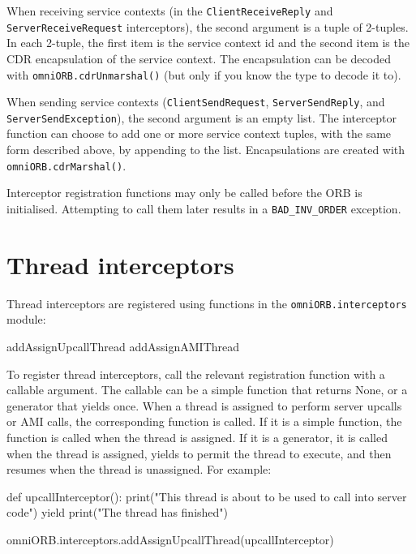 \documentclass[11pt,oneside,a4paper]{book}
\newcommand{\code}[1]{\texttt{#1}}
\newcommand{\op}[1]{\texttt{#1()}}
\newcommand{\dsc}{\discretionary{}{}{}}
\begin{document}
When receiving service contexts (in the \code{ClientReceiveReply} and
\code{Server\dsc{}ReceiveRequest} interceptors), the second argument
is a tuple of 2-tuples. In each 2-tuple, the first item is the service
context id and the second item is the CDR encapsulation of the service
context. The encapsulation can be decoded with
\op{omniORB.cdrUnmarshal} (but only if you know the type to decode it
to).

When sending service contexts (\code{ClientSendRequest},
\code{ServerSendReply}, and \code{ServerSendException}), the second
argument is an empty list. The interceptor function can choose to add
one or more service context tuples, with the same form described
above, by appending to the list.  Encapsulations are created with
\op{omniORB.cdrMarshal}.

Interceptor registration functions may only be called before the ORB
is initialised. Attempting to call them later results in a
\code{BAD\_INV\_ORDER} exception.


\section{Thread interceptors}

Thread interceptors are registered using functions in the
\code{omniORB.interceptors} module:

\begin{pylisting}
  addAssignUpcallThread
  addAssignAMIThread
\end{pylisting}

To register thread interceptors, call the relevant registration
function with a callable argument. The callable can be a simple
function that returns None, or a generator that yields once. When a
thread is assigned to perform server upcalls or AMI calls, the
corresponding function is called. If it is a simple function, the
function is called when the thread is assigned. If it is a generator,
it is called when the thread is assigned, yields to permit the thread
to execute, and then resumes when the thread is unassigned. For
example:

\begin{pylisting}
def upcallInterceptor():
    print("This thread is about to be used to call into server code")
    yield
    print("The thread has finished")

omniORB.interceptors.addAssignUpcallThread(upcallInterceptor)
\end{pylisting}
\end{document}
